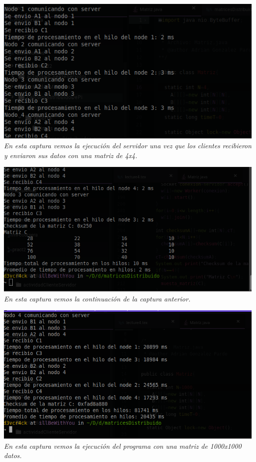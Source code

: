 \documentclass[10pt,executivepaper]{article}
\begin{document}
\begin{center}
\begin{landscape}
  \end{landscape}

  \includegraphics[scale=0.5]{imgs/ejec-nodo0.png}
  \\\textit{En esta captura vemos la ejecución del servidor una vez que los clientes recibieron y enviaron sus datos con una matriz de 4x4.}

  \includegraphics[scale=0.5]{imgs/checksum.png}
  \\\textit{En esta captura vemos la continuación de la captura anterior.}

  \includegraphics[scale=0.5]{imgs/checksum-1.png}
  \\\textit{En esta captura vemos la ejecución del programa con una matriz de 1000x1000 datos.}

\end{center}
\end{document}
